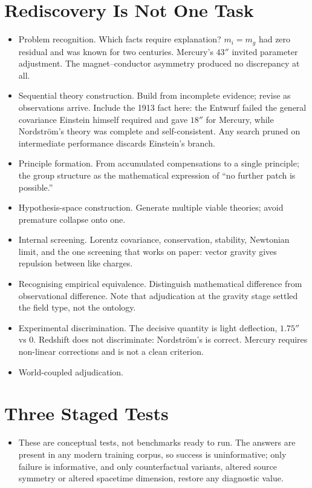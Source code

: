 \documentclass{article}
\begin{document}
\section{Rediscovery Is Not One Task}
\label{sec:not-one-task}
\begin{itemize}
  \item Problem recognition. Which facts require explanation? $m_i = m_g$ had zero residual and was known for two centuries. Mercury's $43''$ invited parameter adjustment. The magnet--conductor asymmetry produced no discrepancy at all.
  \item Sequential theory construction. Build from incomplete evidence; revise as observations arrive. Include the 1913 fact here: the Entwurf failed the general covariance Einstein himself required and gave $18''$ for Mercury, while Nordström's theory was complete and self-consistent. Any search pruned on intermediate performance discards Einstein's branch.
  \item Principle formation. From accumulated compensations to a single principle; the group structure as the mathematical expression of ``no further patch is possible.''
  \item Hypothesis-space construction. Generate multiple viable theories; avoid premature collapse onto one.
  \item Internal screening. Lorentz covariance, conservation, stability, Newtonian limit, and the one screening that works on paper: vector gravity gives repulsion between like charges.
  \item Recognising empirical equivalence. Distinguish mathematical difference from observational difference. Note that adjudication at the gravity stage settled the field type, not the ontology.
  \item Experimental discrimination. The decisive quantity is light deflection, $1.75''$ vs 0. Redshift does not discriminate: Nordström's is correct. Mercury requires non-linear corrections and is not a clean criterion.
  \item World-coupled adjudication.
\end{itemize}

\section{Three Staged Tests}
\label{sec:three-staged-tests}
\begin{itemize}
  \item These are conceptual tests, not benchmarks ready to run. The answers are present in any modern training corpus, so success is uninformative; only failure is informative, and only counterfactual variants, altered source symmetry or altered spacetime dimension, restore any diagnostic value.
\end{itemize}
\end{document}
